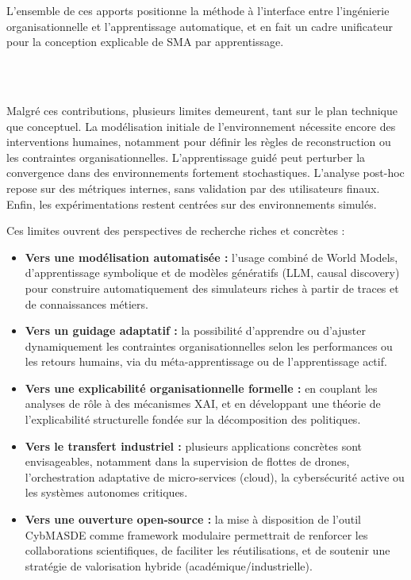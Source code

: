 L’ensemble de ces apports positionne la méthode à l’interface entre l’ingénierie organisationnelle et l’apprentissage automatique, et en fait un cadre unificateur pour la conception explicable de SMA par apprentissage.


\

\bigskip

\\

\noindent
Malgré ces contributions, plusieurs limites demeurent, tant sur le plan technique que conceptuel. La modélisation initiale de l’environnement nécessite encore des interventions humaines, notamment pour définir les règles de reconstruction ou les contraintes organisationnelles. L’apprentissage guidé peut perturber la convergence dans des environnements fortement stochastiques. L’analyse post-hoc repose sur des métriques internes, sans validation par des utilisateurs finaux. Enfin, les expérimentations restent centrées sur des environnements simulés.

Ces limites ouvrent des perspectives de recherche riches et concrètes :

\begin{itemize}
    \item \textbf{Vers une modélisation automatisée :} l’usage combiné de World Models, d’apprentissage symbolique et de modèles génératifs (LLM, causal discovery) pour construire automatiquement des simulateurs riches à partir de traces et de connaissances métiers.

    \item \textbf{Vers un guidage adaptatif :} la possibilité d’apprendre ou d’ajuster dynamiquement les contraintes organisationnelles selon les performances ou les retours humains, via du méta-apprentissage ou de l’apprentissage actif.

    \item \textbf{Vers une explicabilité organisationnelle formelle :} en couplant les analyses de rôle à des mécanismes XAI, et en développant une théorie de l’explicabilité structurelle fondée sur la décomposition des politiques.

    \item \textbf{Vers le transfert industriel :} plusieurs applications concrètes sont envisageables, notamment dans la supervision de flottes de drones, l’orchestration adaptative de micro-services (cloud), la cybersécurité active ou les systèmes autonomes critiques.

    \item \textbf{Vers une ouverture open-source :} la mise à disposition de l’outil CybMASDE comme framework modulaire permettrait de renforcer les collaborations scientifiques, de faciliter les réutilisations, et de soutenir une stratégie de valorisation hybride (académique/industrielle).
\end{itemize}

